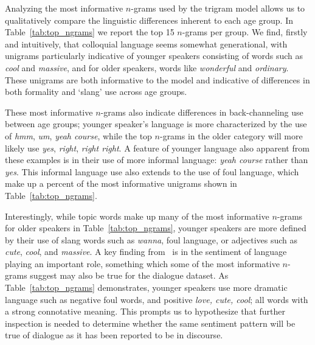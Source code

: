 Analyzing the most informative $n$-grams 
used by the trigram model
allows us to qualitatively compare the linguistic differences inherent to each age group. In Table~\ref{tab:top_ngrams} we report the top 15 $n$-grams per group.
We find, firstly and intuitively, that colloquial language seems somewhat generational, with unigrams particularly indicative of younger speakers consisting of words such as 
\emph{cool} and \emph{massive}, and
for older speakers, words like
\emph{wonderful} and  \emph{ordinary}.
These unigrams are both informative to the model and indicative of differences in both formality and `slang' use across age groups.

These most informative $n$-grams also indicate differences in back-channeling use between age groups; younger speaker's language is more characterized by the use of \emph{hmm}, \emph{um}, \emph{yeah course}, while the top $n$-grams in the older category will more likely use
\emph{yes}, \emph{right}, \emph{right right}.
A feature of younger language also apparent from these examples is in their use of more informal language: \emph{yeah course} rather than \emph{yes}.
This informal language use also extends to the use of foul language, which make up a percent of the most informative unigrams shown in Table~\ref{tab:top_ngrams}. %

Interestingly, while topic words make up many of the most informative $n$-grams for older speakers in Table~\ref{tab:top_ngrams}, younger speakers are more defined by their use of slang words such as \textit{wanna}, foul language, or adjectives such as \textit{cute}, \emph{cool}, and \emph{massive}.
A key finding from~\citet{schler2006effects} is in the sentiment of language playing an important role, something which some of the most informative $n$-grams suggest may also be true for the dialogue dataset. As Table~\ref{tab:top_ngrams} demonstrates, younger speakers use more dramatic language %
such as negative foul words, and positive \textit{love, cute, cool}; all words with a strong connotative meaning. 
This prompts us to hypothesize that further inspection is needed to determine whether the same sentiment pattern will be true of dialogue as it has been reported to be in discourse.


